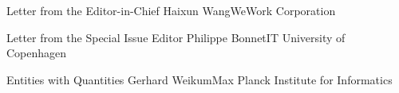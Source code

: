 \documentclass[11pt]{article}
\begin{document}


\begin{bulletin}


%
%

\begin{lettersection}


\begin{letter}{Letter from the Editor-in-Chief}
{Haixun Wang}{WeWork Corporation}

\end{letter}
%
\newpage
%
%
\begin{letter}{Letter from the Special Issue Editor}
{Philippe Bonnet}{IT University of Copenhagen}


\end{letter}

\end{lettersection}


\begin{opinionsection}
\begin{opinion}{Entities with Quantities}
{Gerhard Weikum}{Max Planck Institute for Informatics}

\end{opinion}
\end{opinionsection}


\end{bulletin}
\end{document}
